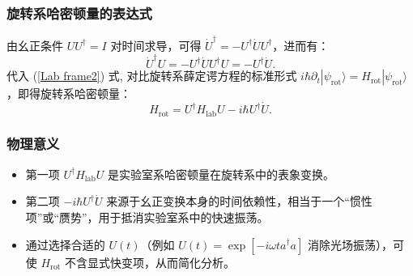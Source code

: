 \subsubsection{旋转系哈密顿量的表达式}
由幺正条件 \(U U^\dagger = I\) 对时间求导，可得 \(\dot{U}^\dagger = -U^\dagger \dot{U} U^\dagger\)，进而有：
\begin{equation}
	\dot{U}^\dagger U = -U^\dagger \dot{U} U^\dagger U = -U^\dagger \dot{U}.
\end{equation}
代入 (\ref{Lab frame2}) 式, 对比旋转系薛定谔方程的标准形式 \(i\hbar \partial_t |\psi_{\text{rot}}\rangle = H_{\text{rot}} |\psi_{\text{rot}}\rangle\)，即得旋转系哈密顿量：
\begin{equation}
	\boxed{ H_{\text{rot}} = U^\dagger H_{\text{lab}} U - i\hbar U^\dagger \dot{U} } .
\end{equation}

\subsubsection{物理意义}
\begin{itemize}
	\item 第一项 \(U^\dagger H_{\text{lab}} U\) 是实验室系哈密顿量在旋转系中的表象变换。
	\item 第二项 \(-i\hbar U^\dagger \dot{U}\) 来源于幺正变换本身的时间依赖性，相当于一个“惯性项”或“赝势”，用于抵消实验室系中的快速振荡。
	\item 通过选择合适的 \(U(t)\)（例如 \(U(t) = \exp[-i\omega t a^\dagger a]\) 消除光场振荡），可使 \(H_{\text{rot}}\) 不含显式快变项，从而简化分析。
\end{itemize}